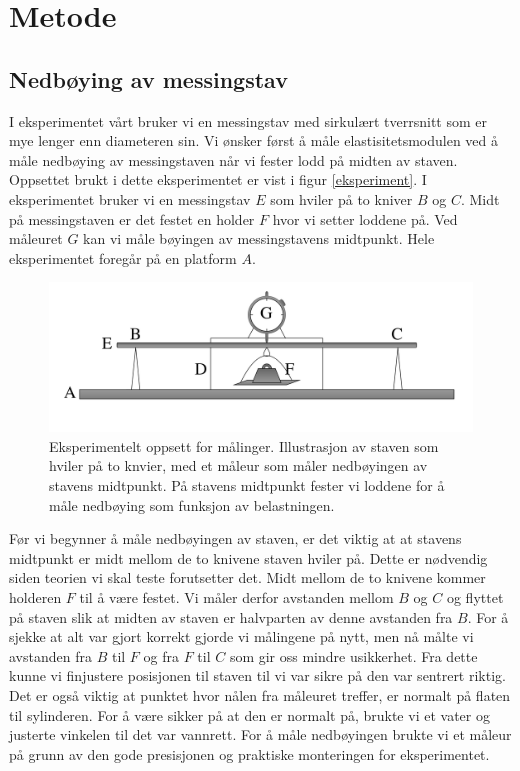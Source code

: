 \documentclass[%
 reprint,
nofootinbib,
aps,
]{revtex4-1}
\begin{document}
\section{Metode}
\subsection{Nedbøying av messingstav}
I eksperimentet vårt bruker vi en messingstav med sirkulært tverrsnitt som er mye lenger enn diameteren sin. Vi ønsker først å måle elastisitetsmodulen ved å måle nedbøying av messingstaven når vi fester lodd på midten av staven. Oppsettet brukt i dette eksperimentet er vist i figur \vref{eksperiment}. I eksperimentet bruker vi en messingstav $E$ som hviler på to kniver $B$ og $C$. Midt på messingstaven er det festet en holder $F$ hvor vi setter loddene på. Ved måleuret $G$ kan vi måle bøyingen av messingstavens midtpunkt. Hele eksperimentet foregår på en platform $A$.\\
\begin{figure}
  \centering
  \includegraphics[scale=0.17]{oppsett.png}
  \caption{Eksperimentelt oppsett for målinger. Illustrasjon av staven som hviler på to knvier, med et måleur som måler nedbøyingen av stavens midtpunkt. På stavens midtpunkt fester vi loddene for å måle nedbøying som funksjon av belastningen.}
  \label{eksperiment}
\end{figure}
Før vi begynner å måle nedbøyingen av staven, er det viktig at at stavens midtpunkt er midt mellom de to knivene staven hviler på. Dette er nødvendig siden teorien vi skal teste forutsetter det. Midt mellom de to knivene kommer holderen $F$ til å være festet. Vi måler derfor avstanden mellom $B$ og $C$ og flyttet på staven slik at midten av staven er halvparten av denne avstanden fra $B$. For å sjekke at alt var gjort korrekt gjorde vi målingene på nytt, men nå målte vi avstanden fra $B$ til $F$ og fra $F$ til $C$ som gir oss mindre usikkerhet. Fra dette kunne vi finjustere posisjonen til staven til vi var sikre på den var sentrert riktig. Det er også viktig at punktet hvor nålen fra måleuret treffer, er normalt på flaten til sylinderen. For å være sikker på at den er normalt på, brukte vi et vater og justerte vinkelen til det var vannrett. For å måle nedbøyingen brukte vi et måleur på grunn av den gode presisjonen og praktiske monteringen for eksperimentet.\\
\end{document}
